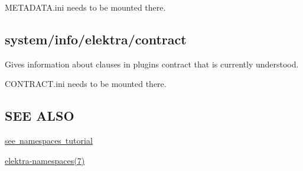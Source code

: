 {\ttfamily M\+E\+T\+A\+D\+A\+T\+A.\+ini} needs to be mounted there.\hypertarget{doc_help_elektra-hierarchy_md_autotoc_md1562}{}\subsection{system/info/elektra/contract}\label{doc_help_elektra-hierarchy_md_autotoc_md1562}
Gives information about clauses in plugin\textquotesingle{}s contract that is currently understood.

{\ttfamily C\+O\+N\+T\+R\+A\+C\+T.\+ini} needs to be mounted there.\hypertarget{doc_help_elektra-hierarchy_md_autotoc_md1563}{}\subsection{S\+E\+E A\+L\+SO}\label{doc_help_elektra-hierarchy_md_autotoc_md1563}

\begin{DoxyItemize}
\item \mbox{\hyperlink{doc_tutorials_namespaces_md}{see namespaces tutorial}}
\item \mbox{\hyperlink{doc_help_elektra-namespaces_md}{elektra-\/namespaces(7)}} 
\end{DoxyItemize}